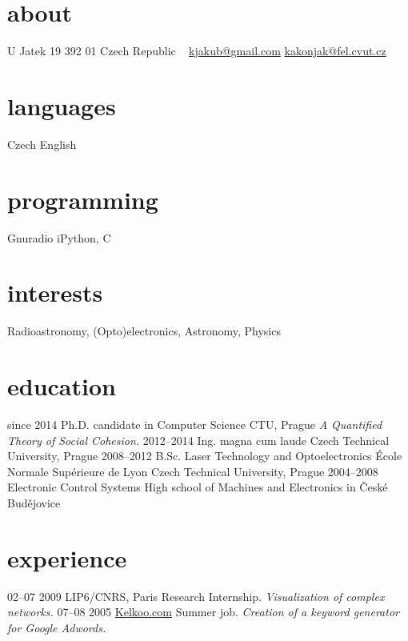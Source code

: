 \documentclass[]{friggeri-cv}
\begin{document}
       {}


\begin{aside}
  \section{about}
    U Jatek 19
    392 01
    Czech Republic
    ~
    \href{mailto:kjakub@gmail.com}{kjakub@gmail.com}
    \href{mailto:kakonjak@fel.cvut.cz}{kakonjak@fel.cvut.cz}
  \section{languages}
    Czech
    English
  \section{programming}
    Gnuradio
    iPython, C
\end{aside}

\section{interests}

Radioastronomy, (Opto)electronics, Astronomy, Physics 

\section{education}

\begin{entrylist}
  \entry
    {since 2014}
    {Ph.D. {\normalfont candidate in Computer Science}}
    {CTU, Prague}
    {\emph{A Quantified Theory of Social Cohesion.}}
  \entry
    {2012–2014}
    {Ing. magna cum laude}
    {Czech Technical University, Prague}
    {}
  \entry
    {2008–2012}
    {B.Sc. Laser Technology and Optoelectronics}
    {École Normale Supérieure de Lyon}
    {Czech Technical University, Prague}
  \entry
    {2004–2008}
    {Electronic Control Systems}
    {High school of Machines and Electronics in České Budějovice}
\end{entrylist}

\section{experience}

\begin{entrylist}
  \entry
    {02–07 2009}
    {LIP6/CNRS, Paris}
    {Research Internship.}
    {\emph{Visualization of complex networks.}}
  \entry
    {07–08 2005}
    {\href{http://www.kelkoo.com}{Kelkoo.com}}
    {Summer job.}
    {\emph{Creation of a keyword generator for Google Adwords.}}
\end{entrylist}
\end{document}
